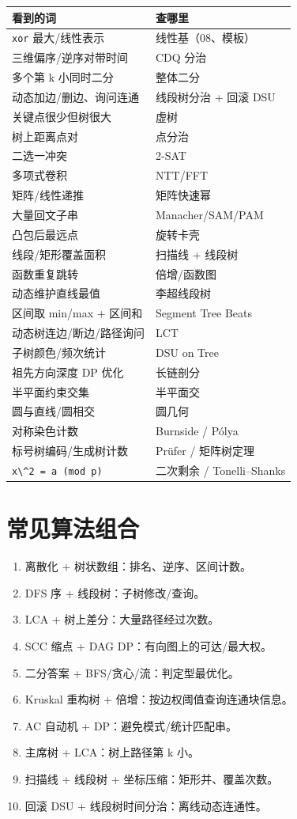 \begin{longtable}[]{@{}ll@{}}
\toprule\noalign{}
看到的词 & 查哪里 \\
\midrule\noalign{}
\endhead
\bottomrule\noalign{}
\endlastfoot
\passthrough{\lstinline!xor!} 最大/线性表示 & 线性基（08、模板） \\
三维偏序/逆序对带时间 & CDQ 分治 \\
多个第 k 小同时二分 & 整体二分 \\
动态加边/删边、询问连通 & 线段树分治 + 回滚 DSU \\
关键点很少但树很大 & 虚树 \\
树上距离点对 & 点分治 \\
二选一冲突 & 2-SAT \\
多项式卷积 & NTT/FFT \\
矩阵/线性递推 & 矩阵快速幂 \\
大量回文子串 & Manacher/SAM/PAM \\
凸包后最远点 & 旋转卡壳 \\
线段/矩形覆盖面积 & 扫描线 + 线段树 \\
函数重复跳转 & 倍增/函数图 \\
动态维护直线最值 & 李超线段树 \\
区间取 min/max + 区间和 & Segment Tree Beats \\
动态树连边/断边/路径询问 & LCT \\
子树颜色/频次统计 & DSU on Tree \\
祖先方向深度 DP 优化 & 长链剖分 \\
半平面约束交集 & 半平面交 \\
圆与直线/圆相交 & 圆几何 \\
对称染色计数 & Burnside / Pólya \\
标号树编码/生成树计数 & Prüfer / 矩阵树定理 \\
\passthrough{\lstinline!x\^2 = a (mod p)!} & 二次剩余 / Tonelli--Shanks \\
\end{longtable}

\section{常见算法组合}\label{ux5e38ux89c1ux7b97ux6cd5ux7ec4ux5408}

\begin{enumerate}
\def\labelenumi{\arabic{enumi}.}
\tightlist
\item
  离散化 + 树状数组：排名、逆序、区间计数。
\item
  DFS 序 + 线段树：子树修改/查询。
\item
  LCA + 树上差分：大量路径经过次数。
\item
  SCC 缩点 + DAG DP：有向图上的可达/最大权。
\item
  二分答案 + BFS/贪心/流：判定型最优化。
\item
  Kruskal 重构树 + 倍增：按边权阈值查询连通块信息。
\item
  AC 自动机 + DP：避免模式/统计匹配串。
\item
  主席树 + LCA：树上路径第 k 小。
\item
  扫描线 + 线段树 + 坐标压缩：矩形并、覆盖次数。
\item
  回滚 DSU + 线段树时间分治：离线动态连通性。
\end{enumerate}
